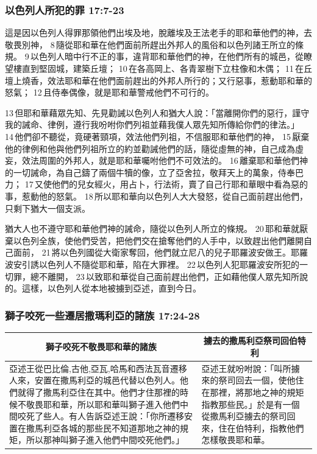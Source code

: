 \subsubsection{以色列人所犯的罪 17:7-23}
這是因以色列人得罪那領他們出埃及地，脫離埃及王法老手的耶和華他們的神，去敬畏別神， 8 隨從耶和華在他們面前所趕出外邦人的風俗和以色列諸王所立的條規。 9 以色列人暗中行不正的事，違背耶和華他們的神，在他們所有的城邑，從瞭望樓直到堅固城，建築丘壇； 10 在各高岡上、各青翠樹下立柱像和木偶； 11 在丘壇上燒香，效法耶和華在他們面前趕出的外邦人所行的；又行惡事，惹動耶和華的怒氣； 12 且侍奉偶像，就是耶和華警戒他們不可行的。

13 但耶和華藉眾先知、先見勸誡以色列人和猶大人說：「當離開你們的惡行，謹守我的誡命、律例，遵行我吩咐你們列祖並藉我僕人眾先知所傳給你們的律法。」 14 他們卻不聽從，竟硬著頸項，效法他們列祖，不信服耶和華他們的神， 15 厭棄他的律例和他與他們列祖所立的約並勸誡他們的話，隨從虛無的神，自己成為虛妄，效法周圍的外邦人，就是耶和華囑咐他們不可效法的。 16 離棄耶和華他們神的一切誡命，為自己鑄了兩個牛犢的像，立了亞舍拉，敬拜天上的萬象，侍奉巴力； 17 又使他們的兒女經火，用占卜，行法術，賣了自己行耶和華眼中看為惡的事，惹動他的怒氣。 18 所以耶和華向以色列人大大發怒，從自己面前趕出他們，只剩下猶大一個支派。

猶大人也不遵守耶和華他們神的誡命，隨從以色列人所立的條規。 20 耶和華就厭棄以色列全族，使他們受苦，把他們交在搶奪他們的人手中，以致趕出他們離開自己面前， 21 將以色列國從大衛家奪回，他們就立尼八的兒子耶羅波安做王。耶羅波安引誘以色列人不隨從耶和華，陷在大罪裡。 22 以色列人犯耶羅波安所犯的一切罪，總不離開， 23 以致耶和華從自己面前趕出他們，正如藉他僕人眾先知所說的。這樣，以色列人從本地被擄到亞述，直到今日。


\subsubsection{獅子咬死一些遷居撒瑪利亞的諸族 17:24-28 }
\begin{table}[H]
\hspace{-10mm}
\centering
\begin{tabular}{p{10.75cm}|p{}}\hline\hline
\multicolumn{1}{c|}{獅子咬死不敬畏耶和華的諸族}&\multicolumn{1}{c}{擄去的撒馬利亞祭司回伯特利}\\\hline
亞述王從巴比倫,古他,亞瓦,哈馬和西法瓦音遷移人來，安置在撒馬利亞的城邑代替以色列人。他們就得了撒馬利亞住在其中。他們才住那裡的時候不敬畏耶和華，所以耶和華叫獅子進入他們中間咬死了些人。有人告訴亞述王說：「你所遷移安置在撒馬利亞各城的那些民不知道那地之神的規矩，所以那神叫獅子進入他們中間咬死他們。」&亞述王就吩咐說：「叫所擄來的祭司回去一個，使他住在那裡，將那地之神的規矩指教那些民。」於是有一個從撒馬利亞擄去的祭司回來，住在伯特利，指教他們怎樣敬畏耶和華。\\\hline
\end{tabular}
\end{table}



